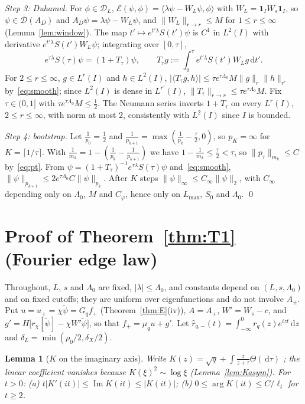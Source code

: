 \documentclass[11pt]{amsart}
\newcommand{\cE}{\mathcal{E}}
\newcommand{\one}{\mathbf{1}}
\newcommand{\dd}{\,\mathrm{d}}
\DeclareMathOperator{\im}{Im}
\newtheorem{lemma}[theorem]{Lemma}
\theoremstyle{definition}
\theoremstyle{remark}
\numberwithin{equation}{section}
\begin{document}
\emph{Step 3: Duhamel.} For $\phi\in \mathcal D_L$, $\cE(\psi,\phi)=\langle\lambda\psi-W_L\psi,\phi\rangle$ with $W_L=\one_IW_s\one_I$, so $\psi\in \mathcal D(A_D)$ and $A_D\psi=\lambda\psi-W_L\psi$, and $\|W_L\|_{r\to r}\le M$ for $1\le r\le\infty$ (Lemma~\ref{lem:window}). The map $t'\mapsto e^{t'\lambda}S(t')\psi$ is $C^1$ in $L^2(I)$ with derivative $e^{t'\lambda}S(t')W_L\psi$; integrating over $[0,\tau]$,
\[
e^{\tau\lambda}S(\tau)\psi=(1+T_\tau)\psi,\qquad T_\tau g:=\int_0^\tau e^{t'\lambda}S(t')W_Lg\dd t' .
\]
For $2\le r\le\infty$, $g\in L^r(I)$ and $h\in L^2(I)$, $|\langle T_\tau g,h\rangle|\le\tau e^{\tau\Lambda_0}M\|g\|_r\|h\|_{r'}$ by~\eqref{eq:smooth}; since $L^2(I)$ is dense in $L^{r'}(I)$, $\|T_\tau\|_{r\to r}\le\tau e^{\tau\Lambda_0}M$. Fix $\tau\in(0,1]$ with $\tau e^{\tau\Lambda_0}M\le\frac12$. The Neumann series inverts $1+T_\tau$ on every $L^r(I)$, $2\le r\le\infty$, with norm at most $2$, consistently with $L^2(I)$ since $I$ is bounded.

\emph{Step 4: bootstrap.} Let $\frac1{p_0}=\frac12$ and $\frac1{p_{k+1}}=\max(\frac1{p_k}-\frac\tau2,0)$, so $p_K=\infty$ for $K=\lceil1/\tau\rceil$. With $\frac1{m_k}=1-(\frac1{p_k}-\frac1{p_{k+1}})$ we have $1-\frac1{m_k}\le\frac\tau2<\tau$, so $\|p_\tau\|_{m_k}\le C$ by~\eqref{eq:pt}. From $\psi=(1+T_\tau)^{-1}e^{\tau\lambda}S(\tau)\psi$ and~\eqref{eq:smooth}, $\|\psi\|_{p_{k+1}}\le2e^{\tau\Lambda_0}C\|\psi\|_{p_k}$. After $K$ steps $\|\psi\|_\infty\le C_\infty\|\psi\|_2$, with $C_\infty$ depending only on $\Lambda_0$, $M$ and $C_\varphi$, hence only on $L_{\max}$, $S_0$ and $\Lambda_0$.
\qed

\section{Proof of Theorem~\ref{thm:T1} (Fourier edge law)}\label{app:T1}

Throughout, $L$, $s$ and $\Lambda_0$ are fixed, $|\lambda|\le\Lambda_0$, and constants depend on $(L,s,\Lambda_0)$ and on fixed cutoffs; they are uniform over eigenfunctions and do not involve $A_\pm$. Put $u=u_+=\chi\tilde\psi=G_qf_+$ (Theorem~\ref{thm:E}(iv)), $A=A_+$, $W'=W_s-c$, and $g'=H\bigl[r_\chi[\tilde\psi]-\chi W'\tilde\psi\bigr]$, so that $f_+=\mu_qu+g'$. Let $\hat r_{q,-}(t)=\int_{-\infty}^0r_q(z)e^{izt}\dd z$ and $\delta_L=\min(\rho_0/2,\delta_X/2)$.

\begin{lemma}[$K$ on the imaginary axis]\label{lem:Kaxis}
Write $K(z)=\sqrt q+\int\frac z{z+\tau}\Theta(\dd\tau)$ \cite[Thm.~6.2]{SSV12}; the linear coefficient vanishes because $K(\xi)^2\sim\log\xi$ (Lemma~\ref{lem:Kasym}). For $t>0$: (a) $t|K'(it)|\le\im K(it)\le|K(it)|$; (b) $0\le\arg K(it)\le C/\ell_t$ for $t\ge2$.
\end{lemma}
\end{document}
